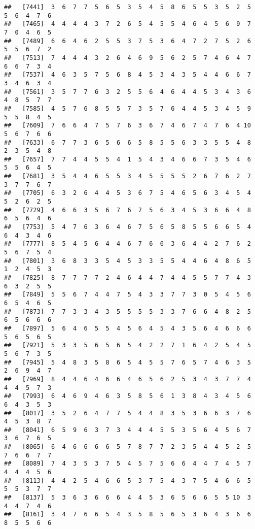 \documentclass[
]{book}
\begin{document}
\begin{verbatim}
##   [7441]  3  6  7  7  5  6  5  3  5  4  5  8  6  5  5  3  5  2  5  5  6  4  7  6
##   [7465]  4  4  4  4  3  7  2  6  5  4  5  5  4  6  4  5  6  9  7  7  0  4  6  5
##   [7489]  6  6  4  6  2  5  5  3  7  5  3  6  4  7  2  7  5  2  6  5  5  6  7  2
##   [7513]  7  4  4  4  3  2  6  4  6  9  5  6  2  5  7  4  6  4  7  6  6  7  3  4
##   [7537]  4  6  3  5  7  5  6  8  4  5  3  4  3  5  4  4  6  6  7  3  4  6  3  4
##   [7561]  3  5  7  7  6  3  2  5  5  6  4  6  4  4  5  3  4  3  6  4  8  5  7  7
##   [7585]  4  5  7  6  8  5  5  7  3  5  7  6  4  4  5  3  4  5  9  5  5  8  4  5
##   [7609]  7  6  6  4  7  5  7  6  3  6  7  4  6  7  4  7  6  4 10  5  6  7  6  6
##   [7633]  6  7  7  3  6  5  6  6  5  8  5  5  6  3  3  5  5  4  8  2  3  5  4  8
##   [7657]  7  7  4  4  5  5  4  1  5  4  3  4  6  6  7  3  5  4  6  5  5  6  4  5
##   [7681]  3  5  4  4  6  5  5  3  4  5  5  5  5  2  6  7  6  2  7  3  7  7  6  7
##   [7705]  6  3  2  6  4  4  5  3  6  7  5  4  6  5  6  3  4  5  4  5  2  6  2  5
##   [7729]  4  6  6  3  5  6  7  6  7  5  6  3  4  5  3  6  6  4  8  6  5  6  4  6
##   [7753]  5  4  7  6  3  6  4  6  7  5  6  5  8  5  5  6  6  5  4  6  4  3  4  6
##   [7777]  8  5  4  5  6  4  4  6  7  6  6  3  6  4  4  2  7  6  2  5  6  7  5  4
##   [7801]  3  6  8  3  3  5  4  5  3  3  5  5  4  4  6  4  8  6  5  1  2  4  5  3
##   [7825]  8  7  7  7  7  2  4  6  4  4  7  4  4  5  5  7  7  4  3  6  3  2  5  5
##   [7849]  5  5  6  7  4  4  7  5  4  3  3  7  7  3  0  5  4  5  6  6  5  4  6  5
##   [7873]  7  7  3  3  4  3  5  5  5  5  3  3  7  6  6  4  8  2  5  6  5  6  6  6
##   [7897]  5  6  4  6  5  5  4  5  6  4  5  4  3  5  6  4  6  6  6  5  6  5  6  5
##   [7921]  5  3  3  5  6  5  6  5  4  2  2  7  1  6  4  2  5  4  5  5  6  7  3  5
##   [7945]  5  4  8  3  5  8  6  5  4  5  5  7  6  5  7  4  6  3  5  2  6  9  4  7
##   [7969]  8  4  4  6  4  6  6  4  6  5  6  2  5  3  4  3  7  7  4  4  4  5  7  3
##   [7993]  6  4  6  9  4  6  3  5  8  5  6  1  3  8  4  3  4  5  6  6  4  3  5  3
##   [8017]  3  5  2  6  4  7  7  5  4  4  8  3  5  3  6  6  3  7  6  4  5  3  8  7
##   [8041]  6  5  9  6  3  7  3  4  4  4  5  5  3  5  6  4  5  6  7  3  6  7  6  5
##   [8065]  6  4  6  6  6  6  5  7  8  7  7  2  3  5  4  4  5  2  5  7  6  6  7  7
##   [8089]  7  4  3  5  3  7  5  4  5  7  5  6  6  4  4  7  4  5  7  4  4  4  5  6
##   [8113]  4  4  2  5  4  6  6  5  3  7  5  4  3  7  5  4  6  6  5  5  5  3  7  7
##   [8137]  5  3  6  3  6  6  6  4  4  5  3  6  5  6  6  5  5 10  3  4  4  7  4  6
##   [8161]  3  4  7  6  6  5  4  3  5  8  5  6  5  3  6  4  3  6  6  8  5  5  6  6

\end{verbatim}
\end{document}
